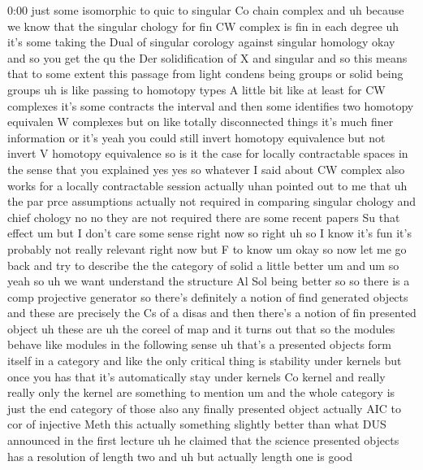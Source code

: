 \begin{unfinished}{0:00}
just  some  isomorphic  to  quic  to  singular
Co  chain
complex  and  uh  because  we  know  that  the
singular  chology  for  fin  CW  complex  is
fin  in  each  degree  uh  it's  some  taking
the  Dual  of  singular  corology  against
singular
homology
okay  and  so  you  get  the
qu  the  Der  solidification  of  X  and
singular
and  so  this  means  that  to  some  extent
this  passage  from  light  condens  being
groups  or  solid  being  groups  uh  is  like
passing  to  homotopy  types  A  little  bit
like  at  least  for  CW  complexes  it's  some
contracts  the  interval  and  then  some
identifies  two  homotopy  equivalen  W
complexes  but  on  like  totally
disconnected  things  it's  much  finer
information  or
it's  yeah  you  could  still  invert
homotopy  equivalence  but  not  invert  V
homotopy
equivalence  so  is  it  the  case  for
locally  contractable  spaces  in  the  sense
that  you  explained  yes  yes  so  whatever  I
said  about  CW  complex  also  works  for  a
locally  contractable  session  actually
uhan  pointed  out  to  me  that  uh  the  par
prce  assumptions  actually  not  required
in  comparing  singular  chology  and  chief
chology
no  no  they  are  not  required  there  are
some  recent  papers  Su  that  effect
um  but  I  don't  care  some  sense  right  now
so  right  uh
so  I  know  it's  fun  it's  probably  not
really  relevant  right  now  but  F  to  know
um  okay
so  now  let  me  go  back  and  try  to
describe  the  the  category  of  solid  a
little  better
um
and  um  so
yeah
so
uh  we  want  understand  the
structure  Al  Sol  being
better  so  so  there  is  a  comp  projective
generator  so  there's  definitely  a  notion
of  find  generated
objects
and  these  are  precisely  the
Cs  of  a
disas  and  then  there's  a  notion  of  fin
presented
object  uh  these  are
uh  the  coreel  of
map  and  it  turns  out  that  so  the  modules
behave  like  modules  in  the  following
sense
uh  that's  a  presented  objects  form
itself  in  a
category
and  like  the  only  critical  thing  is
stability  under  kernels  but  once  you  has
that  it's  automatically  stay  under
kernels  Co
kernel  and  really  really  only  the
kernel  are  something  to  mention
um  and  the  whole  category  is  just  the
end  category  of
those
also  any  finally  presented  object
actually  AIC  to  cor  of  injective
Meth
this  actually  something  slightly  better
than  what  DUS  announced  in  the  first
lecture
uh  he  claimed  that  the  science  presented
objects  has  a  resolution  of  length  two
and  uh  but  actually  length  one  is  good

\end{unfinished}
